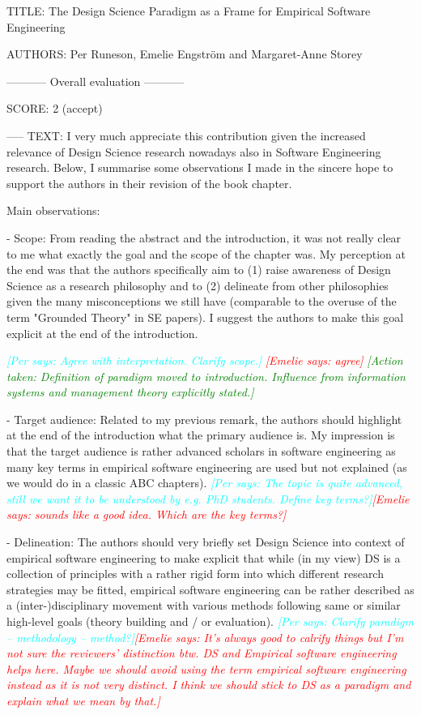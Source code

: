 \documentclass{article}
\newcommand{\emelie}[1]{\textcolor{red}{{\it [Emelie says: #1]}}}
\newcommand{\per}[1]{\textcolor{cyan}{{\it [Per says: #1]}}}
\newcommand{\action}[1]{\textcolor{green}{{\it [Action taken: #1]}}}
\newcommand{\emelie}[1]{}
\newcommand{\per}[1]{}
\newcommand{\action}[1]{}
\begin{document}
TITLE: The Design Science Paradigm as a Frame for Empirical Software Engineering

AUTHORS: Per Runeson, Emelie Engström and Margaret-Anne Storey

----------- Overall evaluation -----------

SCORE: 2 (accept)

----- TEXT:
I very much appreciate this contribution given the increased relevance of Design Science research nowadays also in Software Engineering research. Below, I summarise some observations I made in the sincere hope to support the authors in their revision of the book chapter.

Main observations:

- Scope: From reading the abstract and the introduction, it was not really clear to me what exactly the goal and the scope of the chapter was. My perception at the end was that the authors specifically aim to (1) raise awareness of Design Science as a research philosophy and to (2) delineate from other philosophies given the many misconceptions we still have (comparable to the overuse of the term "Grounded Theory" in SE papers). I suggest the authors to make this goal explicit at the end of the introduction.

\per{Agree with interpretation. Clarify scope.}
\emelie{agree}
\action{Definition of paradigm moved to introduction. Influence from information systems and management theory explicitly stated.}

- Target audience: Related to my previous remark, the authors should highlight at the end of the introduction what the primary audience is. My impression is that the target audience is rather advanced scholars in software engineering as many key terms in empirical software engineering are used but not explained (as we would do in a classic ABC chapters).
\per{The topic is quite advanced, still we want it to be understood by e.g. PhD students. Define key terms?}\emelie{sounds like a good idea. Which are the key terms?}

- Delineation: The authors should very briefly set Design Science into context of empirical software engineering to make explicit that while (in my view) DS is a collection of principles with a rather rigid form into which different research strategies may be fitted, empirical software engineering can be rather described as a (inter-)disciplinary movement with various methods following same or similar high-level goals (theory building and / or evaluation). \per{Clarify paradigm -- methodology -- method?}\emelie{It's always good to calrify things but I'm not sure the reviewers' distinction btw. DS and Empirical software engineering helps here. Maybe we should avoid using the term empirical software engineering instead as it is not very distinct. I think we should stick to DS as a paradigm and explain what we mean by that.}
\end{document}
